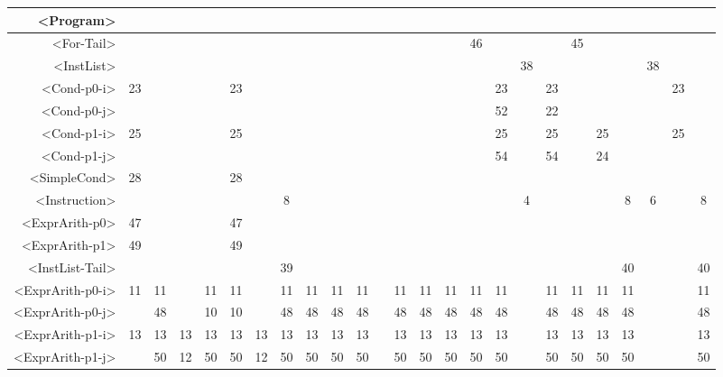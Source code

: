 \begin{tabular}{r|c@{ }c@{ }c@{ }c@{ }c@{ }c@{ }c@{ }c@{ }c@{ }c@{ }c@{ }c@{ }c@{ }c@{ }c@{ }c@{ }c@{ }c@{ }c@{ }c@{ }c@{ }c@{ }c@{ }c@{ }}
<Program> &   &   &   &   &   &   &   &   &   &   &   &   &   &   &   &   &   &   &   &   &   &   &   &   \\\hline
<For-Tail> &   &   &   &   &   &   &   &   &   &   &   &   &   &   & 46 &   &   &   & 45 &   &   &   &   &   \\\hline
<InstList> &   &   &   &   &   &   &   &   &   &   &   &   &   &   &   &   & 38 &   &   &   &   & 38 &   &   \\\hline
<Cond-p0-i> & 23 &   &   &   & 23 &   &   &   &   &   &   &   &   &   &   & 23 &   & 23 &   &   &   &   & 23 &   \\\hline
<Cond-p0-j> &   &   &   &   &   &   &   &   &   &   &   &   &   &   &   & 52 &   & 22 &   &   &   &   &   &   \\\hline
<Cond-p1-i> & 25 &   &   &   & 25 &   &   &   &   &   &   &   &   &   &   & 25 &   & 25 &   & 25 &   &   & 25 &   \\\hline
<Cond-p1-j> &   &   &   &   &   &   &   &   &   &   &   &   &   &   &   & 54 &   & 54 &   & 24 &   &   &   &   \\\hline
<SimpleCond> & 28 &   &   &   & 28 &   &   &   &   &   &   &   &   &   &   &   &   &   &   &   &   &   &   &   \\\hline
<Instruction> &   &   &   &   &   &   & 8 &   &   &   &   &   &   &   &   &   & 4 &   &   &   & 8 & 6 &   & 8 \\\hline
<ExprArith-p0> & 47 &   &   &   & 47 &   &   &   &   &   &   &   &   &   &   &   &   &   &   &   &   &   &   &   \\\hline
<ExprArith-p1> & 49 &   &   &   & 49 &   &   &   &   &   &   &   &   &   &   &   &   &   &   &   &   &   &   &   \\\hline
<InstList-Tail> &   &   &   &   &   &   & 39 &   &   &   &   &   &   &   &   &   &   &   &   &   & 40 &   &   & 40 \\\hline
<ExprArith-p0-i> & 11 & 11 &   & 11 & 11 &   & 11 & 11 & 11 & 11 &   & 11 & 11 & 11 & 11 & 11 &   & 11 & 11 & 11 & 11 &   &   & 11 \\\hline
<ExprArith-p0-j> &   & 48 &   & 10 & 10 &   & 48 & 48 & 48 & 48 &   & 48 & 48 & 48 & 48 & 48 &   & 48 & 48 & 48 & 48 &   &   & 48 \\\hline
<ExprArith-p1-i> & 13 & 13 & 13 & 13 & 13 & 13 & 13 & 13 & 13 & 13 &   & 13 & 13 & 13 & 13 & 13 &   & 13 & 13 & 13 & 13 &   &   & 13 \\\hline
<ExprArith-p1-j> &   & 50 & 12 & 50 & 50 & 12 & 50 & 50 & 50 & 50 &   & 50 & 50 & 50 & 50 & 50 &   & 50 & 50 & 50 & 50 &   &   & 50 \\\hline
\end{tabular}


